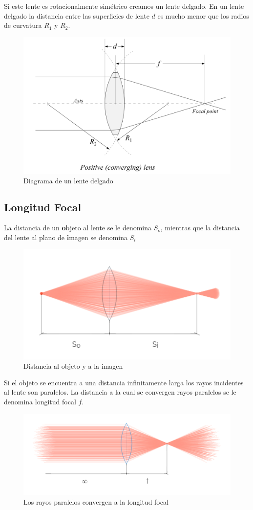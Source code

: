 \documentclass{article}
\begin{document}
Si este lente es rotacionalmente simétrico creamos un lente delgado. En un lente delgado la distancia entre las superficies de lente $d$ es mucho menor que los radios de curvatura $R_1$ y $R_2$.

\begin{figure}[H]
	\centering
	\includegraphics[width=0.75\linewidth]{Figuras/Thin_Lens}
	\caption{Diagrama de un lente delgado}
	\label{fig:thinlens}
\end{figure}


\subsection{Longitud Focal}

La distancia de un \textbf{o}bjeto al lente se le denomina $S_o$, mientras que la distancia del lente al plano de \textbf{i}magen se denomina $S_i$

\begin{figure}[H]
	\centering
	\includegraphics[width=0.65\linewidth]{Figuras/So_Si_Equal}
	\caption{Distancia al objeto y a la imagen}
	\label{fig:sosiequal}
\end{figure}

Si el objeto se encuentra a una distancia infinitamente larga los rayos incidentes al lente son paralelos. La distancia a la cual se convergen rayos paralelos se le denomina longitud focal $f$.

\begin{figure}[H]
	\centering
	\includegraphics[width=0.65\linewidth]{Figuras/Variables_Longitud_Focal}
	\caption{Los rayos paralelos convergen a la longitud focal}
	\label{fig:variableslongitudfocal}
\end{figure}
\end{document}
